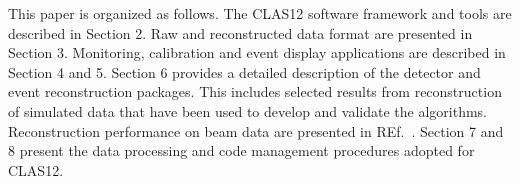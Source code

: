 This paper is organized as follows. The CLAS12 software framework and tools are described in Section 2. Raw and reconstructed data format are presented in Section 3. Monitoring, calibration and event display applications are described in Section 4 and 5. Section 6 provides a detailed description of the detector and event reconstruction packages. This includes selected results from reconstruction of simulated data that have been used to develop and validate the algorithms. Reconstruction performance on beam data are presented in REf.~\cite{clas12-nim}. Section 7 and 8 present the data processing and code management procedures adopted for CLAS12.


